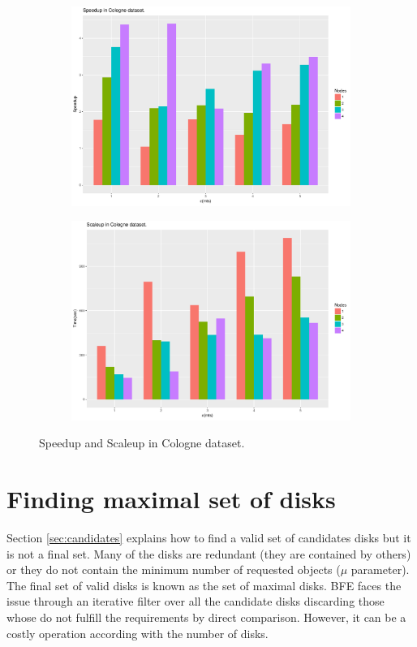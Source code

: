 \documentclass[12pt]{scrartcl}
\begin{document}
\begin{figure}
\centering
\begin{subfigure}{.5\textwidth}
  \centering \includegraphics[width=\linewidth]{figures/2_Cologne_Speedup}
\end{subfigure}%
\begin{subfigure}{.5\textwidth}
  \centering \includegraphics[width=\linewidth]{figures/3_Cologne_Scaleup}
\end{subfigure}
\caption{Speedup and Scaleup in Cologne dataset.}
\label{fig:SSCologne}
\end{figure}

\section{Finding maximal set of disks}
Section \ref{sec:candidates} explains how to find a valid set of candidates disks but it is not a final set.  Many of the disks are redundant (they are contained by others) or they do not contain the minimum number of requested objects ($\mu$ parameter).  The final set of valid disks is known as the set of maximal disks.  BFE faces the issue through an iterative filter over all the candidate disks discarding those whose do not fulfill the requirements by direct comparison. However, it can be a costly operation according with the number of disks.
\end{document}
